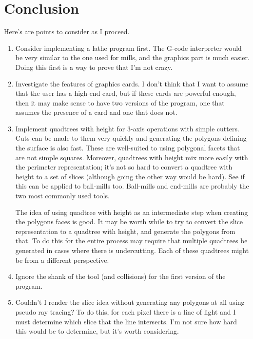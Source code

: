 \documentclass[titlepage,oneside,10pt]{article}
\begin{document}
\section{Conclusion}

Here's are points to consider as I proceed.

\begin{enumerate}
\item Consider implementing a lathe program first. The G-code
  interpreter would be very similar to the one used for mills, and the
  graphics part is much easier. Doing this first is a way to prove
  that I'm not crazy.
\item Investigate the features of graphics cards. I don't think that I
  want to assume that the user has a high-end card, but if these cards
  are powerful enough, then it may make sense to have two versions of
  the program, one that assumes the presence of a card and one that
  does not.
\item Implement quadtrees with height for 3-axis operations with simple
  cutters. Cuts can be made to them very quickly and generating the
  polygons defining the surface is also fast. These are well-suited to
  using polygonal facets that are not simple squares. Moreover,
  quadtrees with height mix more easily with the perimeter
  representation; it's not so hard to convert a quadtree with height
  to a set of slices (although going the other way would be hard). See
  if this can be applied to ball-mills too. Ball-mills and end-mills
  are probably the two most commonly used tools. 

The idea of using quadtree with height as an intermediate step when
creating the polygons faces is good. It may be worth while to try to
convert the slice representation to a quadtree with height, and
generate the polygons from that. To do this for the entire process may
require that multiple quadtrees be generated in cases where there is
undercutting. Each of these quadtrees might be from a different
perspective.
\item Ignore the shank of the tool (and collisions) for the first
  version of the program.
\item Couldn't I render the slice idea without generating any polygons
  at all using pseudo ray tracing? To do this, for each pixel there is
  a line of light and I must determine which slice that the line
  intersects. I'm not sure how hard this would be to determine, but
  it's worth considering.
\end{enumerate}
\end{document}
